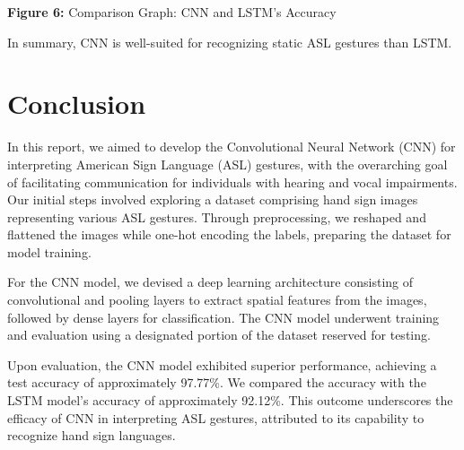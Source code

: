 \documentclass[conference]{IEEEtran}
\begin{document}
\vspace{\baselineskip}

\begin{center}

  \textbf{Figure 6:} Comparison Graph: CNN and LSTM's Accuracy 
\end{center}


\vspace{\baselineskip}

In summary, CNN is well-suited for recognizing static ASL gestures than LSTM.

\vspace{\baselineskip}

\section{Conclusion}

In this report, we aimed to develop the Convolutional Neural Network (CNN) for interpreting American Sign Language (ASL) gestures, with the overarching goal of facilitating communication for individuals with hearing and vocal impairments. Our initial steps involved exploring a dataset comprising hand sign images representing various ASL gestures. Through preprocessing, we reshaped and flattened the images while one-hot encoding the labels, preparing the dataset for model training.

\vspace{\baselineskip}

For the CNN model, we devised a deep learning architecture consisting of convolutional and pooling layers to extract spatial features from the images, followed by dense layers for classification. The CNN model underwent training and evaluation using a designated portion of the dataset reserved for testing.

\vspace{\baselineskip}

Upon evaluation, the CNN model exhibited superior performance, achieving a test accuracy of approximately 97.77\%. We compared the accuracy with the LSTM model's accuracy of approximately 92.12\%. This outcome underscores the efficacy of CNN in interpreting ASL gestures, attributed to its capability to recognize hand sign languages.
\end{document}
